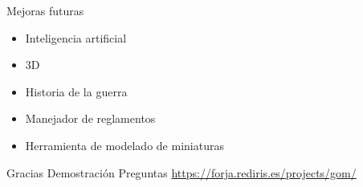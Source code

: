 \documentclass[green, compress]{beamer}
\begin{document}
\begin{frame}
\begin{block}{Mejoras futuras}
\begin{itemize}
\item Inteligencia artificial
\item 3D
\item Historia de la guerra
\item Manejador de reglamentos
\item Herramienta de modelado de miniaturas
\end{itemize}
\end{block}
\end{frame}

\begin{frame}
  \begin{center}
    \Huge{Gracias}
    \vfill
    \LARGE {Demostración}
    \vfill
    \LARGE {Preguntas}
    \vfill
    \large{\url{https://forja.rediris.es/projects/gom/}}
  \end{center}
\end{frame}
\end{document}
